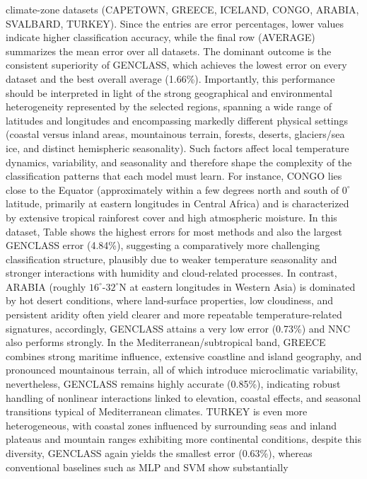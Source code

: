 \documentclass[12pt]{Definitions/academia}
\begin{document}
climate-zone datasets (CAPETOWN, GREECE, ICELAND, CONGO, ARABIA, SVALBARD,
TURKEY). 
\clearpage
Since the entries are error percentages, lower values indicate
higher classification accuracy, while the final row (AVERAGE) summarizes
the mean error over all datasets. The dominant outcome is the consistent
superiority of GENCLASS, which achieves the lowest error on every
dataset and the best overall average (1.66\%). Importantly, this performance
should be interpreted in light of the strong geographical and environmental
heterogeneity represented by the selected regions, spanning a wide
range of latitudes and longitudes and encompassing markedly different
physical settings (coastal versus inland areas, mountainous terrain,
forests, deserts, glaciers/sea ice, and distinct hemispheric seasonality).
Such factors affect local temperature dynamics, variability, and seasonality
and therefore shape the complexity of the classification patterns
that each model must learn. For instance, CONGO lies close to the
Equator (approximately within a few degrees north and south of $0^\circ$
latitude, primarily at eastern longitudes in Central Africa) and is
characterized by extensive tropical rainforest cover and high atmospheric
moisture. In this dataset, Table
shows the highest errors for most methods and also the largest GENCLASS
error (4.84\%), suggesting a comparatively more challenging classification
structure, plausibly due to weaker temperature seasonality and stronger
interactions with humidity and cloud-related processes. In contrast,
ARABIA (roughly $16^\circ$-$32^\circ$N at eastern longitudes in Western Asia) is
dominated by hot desert conditions, where land-surface properties,
low cloudiness, and persistent aridity often yield clearer and more
repeatable temperature-related signatures, accordingly, GENCLASS attains
a very low error (0.73\%) and NNC also performs strongly. In the Mediterranean/subtropical
band, GREECE combines strong maritime
influence, extensive coastline and island geography, and pronounced
mountainous terrain, all of which introduce microclimatic variability,
nevertheless, GENCLASS remains highly accurate (0.85\%), indicating
robust handling of nonlinear interactions linked to elevation, coastal
effects, and seasonal transitions typical of Mediterranean climates.
TURKEY  is even more heterogeneous,
with coastal zones influenced by surrounding seas and inland plateaus
and mountain ranges exhibiting more continental conditions, despite
this diversity, GENCLASS again yields the smallest error (0.63\%),
whereas conventional baselines such as MLP and SVM show substantially
\end{document}
